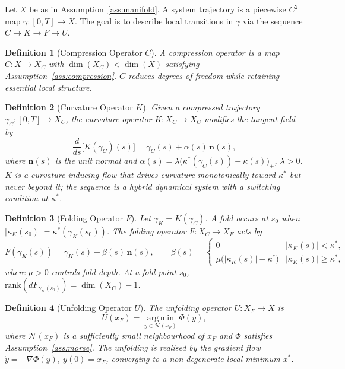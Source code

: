 \documentclass[14pt,a4paper]{extarticle}
\newtheorem{definition}{Definition}[section]
\begin{document}

Let $X$ be as in Assumption~\ref{ass:manifold}.
A system trajectory is a piecewise $C^2$ map
$\gamma : [0,T] \to X$.
The goal is to describe local transitions in $\gamma$ via the sequence
$C \to K \to F \to U$.

\begin{definition}[Compression Operator $C$]
\label{def:C}
A \emph{compression operator} is a map $C : X \to X_C$ with
$\dim(X_C) < \dim(X)$ satisfying Assumption~\ref{ass:compression}.
$C$ reduces degrees of freedom while retaining essential local
structure.
\end{definition}

\begin{definition}[Curvature Operator $K$]
\label{def:K}
Given a compressed trajectory $\gamma_C : [0,T] \to X_C$,
the \emph{curvature operator} $K : X_C \to X_C$ modifies the tangent
field by
\[
  \frac{d}{ds}\bigl[K(\gamma_C)(s)\bigr]
  = \dot\gamma_C(s) + \alpha(s)\,\mathbf{n}(s),
\]
where $\mathbf{n}(s)$ is the unit normal and
$\alpha(s) = \lambda\bigl(\kappa^*(\gamma_C(s)) - \kappa(s)\bigr)_+$,
$\lambda > 0$.
$K$ is a curvature-inducing flow that drives curvature monotonically
toward $\kappa^*$ but never beyond it; the sequence is a hybrid
dynamical system with a switching condition at $\kappa^*$.
\end{definition}

\begin{definition}[Folding Operator $F$]
\label{def:F}
Let $\gamma_K = K(\gamma_C)$.
A fold occurs at $s_0$ when $|\kappa_K(s_0)| = \kappa^*(\gamma_K(s_0))$.
The \emph{folding operator} $F : X_C \to X_F$ acts by
\[
  F(\gamma_K(s)) = \gamma_K(s) - \beta(s)\,\mathbf{n}(s),
  \qquad
  \beta(s) =
  \begin{cases}
    0 & |\kappa_K(s)| < \kappa^*, \\
    \mu\bigl(|\kappa_K(s)| - \kappa^*\bigr) & |\kappa_K(s)| \geq \kappa^*,
  \end{cases}
\]
where $\mu > 0$ controls fold depth.
At a fold point $s_0$, $\mathrm{rank}(dF_{\gamma_K(s_0)}) =
\dim(X_C) - 1$.
\end{definition}

\begin{definition}[Unfolding Operator $U$]
\label{def:U}
The \emph{unfolding operator} $U : X_F \to X$ is
\[
  U(x_F) = \operatorname*{arg\,min}_{y \in \mathcal{N}(x_F)} \Phi(y),
\]
where $\mathcal{N}(x_F)$ is a sufficiently small neighbourhood of
$x_F$ and $\Phi$ satisfies Assumption~\ref{ass:morse}.
The unfolding is realised by the gradient flow
$\dot{y} = -\nabla\Phi(y)$, $y(0) = x_F$,
converging to a non-degenerate local minimum $x^*$.
\end{definition}
\end{document}
